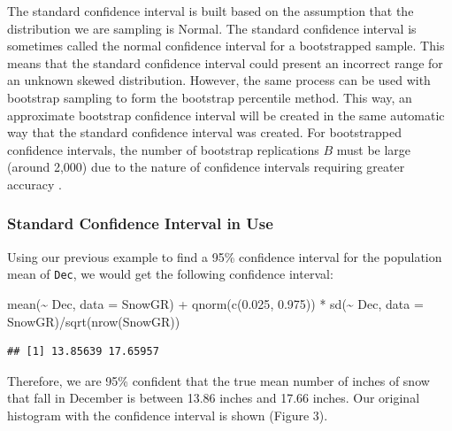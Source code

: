 \documentclass[12pt]{article}
\newenvironment{Shaded}{\begin{snugshade}}{\end{snugshade}}
\newcommand{\AttributeTok}[1]{\textcolor[rgb]{0.77,0.63,0.00}{#1}}
\newcommand{\FloatTok}[1]{\textcolor[rgb]{0.00,0.00,0.81}{#1}}
\newcommand{\FunctionTok}[1]{\textcolor[rgb]{0.00,0.00,0.00}{#1}}
\newcommand{\NormalTok}[1]{#1}
\newcommand{\SpecialCharTok}[1]{\textcolor[rgb]{0.00,0.00,0.00}{#1}}
\begin{document}
The standard confidence interval is built based on the assumption that
the distribution we are sampling is Normal. The standard confidence
interval is sometimes called the normal confidence interval for a
bootstrapped sample. This means that the standard confidence interval
could present an incorrect range for an unknown skewed distribution.
However, the same process can be used with bootstrap sampling to form
the bootstrap percentile method. This way, an approximate bootstrap
confidence interval will be created in the same automatic way that the
standard confidence interval was created. For bootstrapped confidence
intervals, the number of bootstrap replications \(B\) must be large
(around 2,000) due to the nature of confidence intervals requiring
greater accuracy \citep{Efron86}.

\hypertarget{standard-confidence-interval-in-use}{%
\subsubsection{Standard Confidence Interval in
Use}\label{standard-confidence-interval-in-use}}

Using our previous example to find a 95\% confidence interval for the
population mean of \texttt{Dec}, we would get the following confidence
interval:

\begin{Shaded}
\begin{Highlighting}[]
\FunctionTok{mean}\NormalTok{(}\SpecialCharTok{\textasciitilde{}}\NormalTok{ Dec, }\AttributeTok{data =}\NormalTok{ SnowGR) }\SpecialCharTok{+} \FunctionTok{qnorm}\NormalTok{(}\FunctionTok{c}\NormalTok{(}\FloatTok{0.025}\NormalTok{, }\FloatTok{0.975}\NormalTok{)) }\SpecialCharTok{*} 
  \FunctionTok{sd}\NormalTok{(}\SpecialCharTok{\textasciitilde{}}\NormalTok{ Dec, }\AttributeTok{data =}\NormalTok{ SnowGR)}\SpecialCharTok{/}\FunctionTok{sqrt}\NormalTok{(}\FunctionTok{nrow}\NormalTok{(SnowGR))}
\end{Highlighting}
\end{Shaded}

\begin{verbatim}
## [1] 13.85639 17.65957
\end{verbatim}

Therefore, we are 95\% confident that the true mean number of inches of
snow that fall in December is between 13.86 inches and 17.66 inches. Our
original histogram with the confidence interval is shown (Figure 3).
\end{document}
